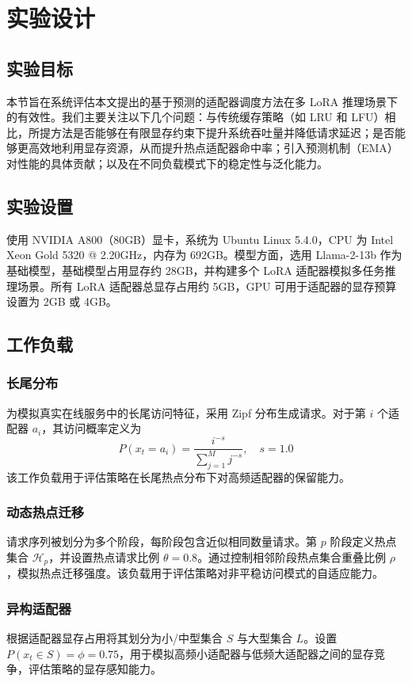\section{实验设计}
\subsection{实验目标}
本节旨在系统评估本文提出的基于预测的适配器调度方法在多 LoRA 推理场景下的有效性。我们主要关注以下几个问题：与传统缓存策略（如 LRU 和 LFU）相比，所提方法是否能够在有限显存约束下提升系统吞吐量并降低请求延迟；是否能够更高效地利用显存资源，从而提升热点适配器命中率；引入预测机制（EMA）对性能的具体贡献；以及在不同负载模式下的稳定性与泛化能力。

\subsection{实验设置}
使用 NVIDIA A800（80GB）显卡，系统为 Ubuntu Linux 5.4.0，CPU 为 Intel Xeon Gold 5320 @ 2.20GHz，内存为 692GB。模型方面，选用 Llama-2-13b 作为基础模型，基础模型占用显存约 28GB，并构建多个 LoRA 适配器模拟多任务推理场景。所有 LoRA 适配器总显存占用约 5GB，GPU 可用于适配器的显存预算设置为 2GB 或 4GB。

\subsection{工作负载}
\subsubsection{长尾分布}
为模拟真实在线服务中的长尾访问特征，采用 Zipf 分布生成请求。对于第 $i$ 个适配器 $a_i$，其访问概率定义为
\begin{equation}
P(x_t=a_i)=\frac{i^{-s}}{\sum_{j=1}^{M}j^{-s}},\quad s=1.0
\end{equation}
该工作负载用于评估策略在长尾热点分布下对高频适配器的保留能力。

\subsubsection{动态热点迁移}
请求序列被划分为多个阶段，每阶段包含近似相同数量请求。第 $p$ 阶段定义热点集合 $\mathcal{H}_p$，并设置热点请求比例 $\theta=0.8$。通过控制相邻阶段热点集合重叠比例 $\rho$，模拟热点迁移强度。该负载用于评估策略对非平稳访问模式的自适应能力。

\subsubsection{异构适配器}
根据适配器显存占用将其划分为小/中型集合 $S$ 与大型集合 $L$。设置 $P(x_t\in S)=\phi=0.75$，用于模拟高频小适配器与低频大适配器之间的显存竞争，评估策略的显存感知能力。

